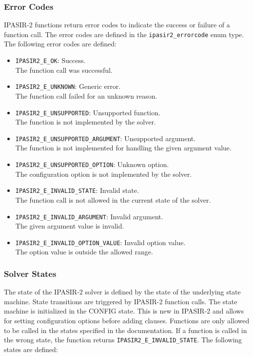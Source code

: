 \documentclass[sat]{iosart2x}
\begin{document}
\subsubsection{Error Codes}

IPASIR-2 functions return error codes to indicate the success or failure of a function call.
The error codes are defined in the \texttt{ipasir2\_errorcode} enum type.
The following error codes are defined:

\begin{itemize}
    \item \texttt{IPASIR2\_E\_OK}: Success.\\
    The function call was successful.
    \item \texttt{IPASIR2\_E\_UNKNOWN}: Generic error.\\
    The function call failed for an unknown reason.
    \item \texttt{IPASIR2\_E\_UNSUPPORTED}: Unsupported function.\\
    The function is not implemented by the solver.
    \item \texttt{IPASIR2\_E\_UNSUPPORTED\_ARGUMENT}: Unsupported argument.\\
    The function is not implemented for handling the given argument value.
    \item \texttt{IPASIR2\_E\_UNSUPPORTED\_OPTION}: Unknown option.\\
    The configuration option is not implemented by the solver.
    \item \texttt{IPASIR2\_E\_INVALID\_STATE}: Invalid state.\\
    The function call is not allowed in the current state of the solver.
    \item \texttt{IPASIR2\_E\_INVALID\_ARGUMENT}: Invalid argument.\\
    The given argument value is invalid.
    \item \texttt{IPASIR2\_E\_INVALID\_OPTION\_VALUE}: Invalid option value.\\
    The option value is outside the allowed range.
\end{itemize}

\subsubsection{Solver States}

The state of the IPASIR-2 solver is defined by the state of the underlying state machine.
State transitions are triggered by IPASIR-2 function calls.
The state machine is initialized in the CONFIG state.
This is new in IPASIR-2 and allows for setting configuration options before adding clauses.
Functions are only allowed to be called in the states specified in the documentation.
If a function is called in the wrong state, the function returns \texttt{IPASIR2\_E\_INVALID\_STATE}.
The following states are defined:
\end{document}

